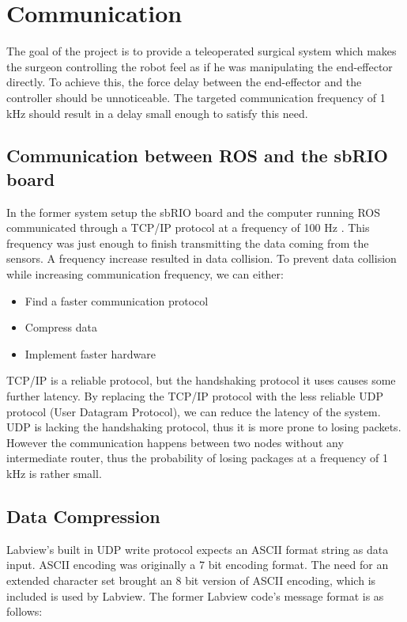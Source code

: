 \chapter{Communication}\label{cha:communication}

The goal of the project is to provide a teleoperated surgical system which makes the surgeon controlling the robot feel as if he was manipulating the end-effector directly. To achieve this, the force delay between the end-effector and the controller should be unnoticeable. The targeted communication frequency of 1 kHz should result in a delay small enough to satisfy this need.

\section{Communication between ROS and the sbRIO board}

In the former system setup the sbRIO board and the computer running ROS communicated through a TCP/IP protocol at a frequency of 100 Hz \cite{System_Overwiew}. This frequency was just enough to finish transmitting the data coming from the sensors. A frequency increase resulted in data collision. To prevent data collision while increasing communication frequency, we can either:

\begin{itemize}
	\item Find a faster communication protocol
	\item Compress data
	\item Implement faster hardware	
\end{itemize}


TCP/IP is a reliable protocol, but the handshaking protocol it uses causes some further latency. By replacing the TCP/IP protocol with the less reliable UDP protocol (User Datagram Protocol), we can reduce the latency of the system. UDP is lacking the handshaking protocol, thus it is more prone to losing packets. However the communication happens between two nodes without any intermediate router, thus the probability of losing packages at a frequency of 1 kHz is rather small.

\section{Data Compression}

Labview's built in UDP write protocol expects an ASCII format string as data input. ASCII encoding was originally a 7 bit encoding format. The need for an extended character set brought an 8 bit version of ASCII encoding, which is included is used by Labview. The former Labview code's message format is as follows:


